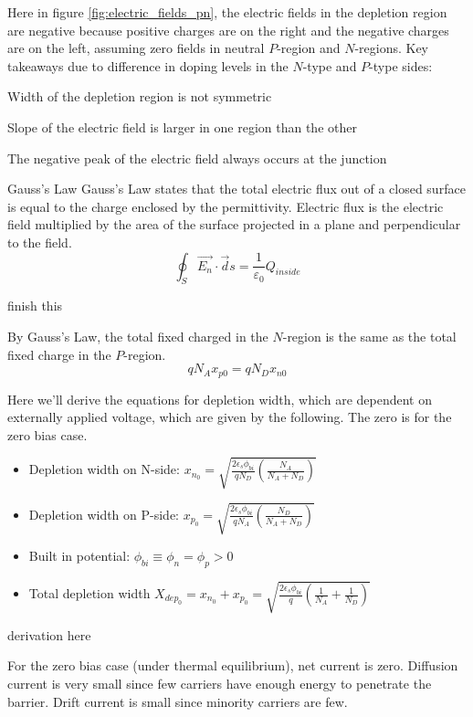 Here in figure \ref{fig:electric_fields_pn}, the electric fields in the depletion region are negative because positive charges are on the right and the negative charges are on the left, assuming zero fields in neutral $P$-region and $N$-regions. Key takeaways due to difference in doping levels in the $N$-type and $P$-type sides:
\begin{pline}
    \item Width of the depletion region is not symmetric
    \item Slope of the electric field is larger in one region than the other
    \item The negative peak of the electric field always occurs at the junction
\end{pline}

\begin{Analysis}{Gauss's Law}{}
    Gauss's Law states that the total electric flux out of a closed surface is equal to the charge enclosed by the permittivity. Electric flux is the electric field multiplied by the area of the surface projected in a plane and perpendicular to the field.
        \[\oint_S {\vec{E_n} \cdot \vec{d}s = \frac{1}{{\varepsilon _0 }}} Q_{inside}\]
    \begin{todo}
        \item finish this
    \end{todo}
    By Gauss's Law, the total fixed charged in the $N$-region is the same as the total fixed charge in the $P$-region.
        \[q N_A x_{p0} = q N_D x_{n0}\]
\end{Analysis}
Here we'll derive the equations for depletion width, which are dependent on externally applied voltage, which are given by the following. The zero is for the zero bias case.
\begin{itemize}
   \item[] Depletion width on N-side: {\Large $x_{n_0} = \sqrt{\frac{2 \epsilon_s \phi_{bi}}{q N_D} (\frac{N_A}{N_A + N_D})}$}
   \item[] Depletion width on P-side: {\Large $x_{p_0} = \sqrt{\frac{2 \epsilon_s \phi_{bi}}{q N_A} (\frac{N_D}{N_A + N_D})}$}
   \item[] Built in potential: {\Large $\phi_{bi} \equiv \phi_n = \phi_p > 0$}
   \item[] Total depletion width {\Large $X_{dep_0} = x_{n_0} + x_{p_0} = \sqrt{\frac{2 \epsilon_s \phi_{bi}}{q}(\frac{1}{N_A} + \frac{1}{N_D})}$}
\end{itemize}

\begin{todo}
    \item derivation here
\end{todo}
For the zero bias case (under thermal equilibrium), net current is zero. Diffusion current is very small since few carriers have enough energy to penetrate the barrier. Drift current is small since minority carriers are few.
